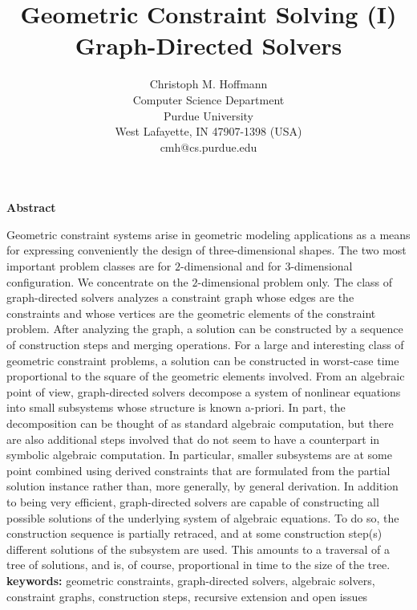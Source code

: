 \textheight 200mm
\title{Geometric Constraint Solving (I) Graph-Directed Solvers}
\author{Christoph M. Hoffmann \\
Computer Science Department \\
Purdue University \\
West Lafayette, IN 47907-1398 (USA) \\
cmh@cs.purdue.edu}



\date{} 
\pagestyle{empty}




\maketitle

\centerline{\bf Abstract}

\medskip
   Geometric constraint systems arise in geometric modeling applications as 
a means for expressing conveniently the design of three-dimensional shapes. 
The two most important problem classes are for $2$-dimensional and for 
$3$-dimensional configuration.  We concentrate on the $2$-dimensional  
problem only.   The class of graph-directed solvers analyzes a constraint 
graph whose edges are the constraints and whose vertices are the geometric 
elements of the constraint problem.  After analyzing the graph, a solution 
can be constructed by a sequence of construction steps and merging 
operations. For a large and interesting class of geometric constraint 
problems, a solution can be constructed in worst-case time proportional to 
the square of the geometric elements involved.   From an algebraic point of 
view, graph-directed solvers decompose a system of nonlinear equations into 
small subsystems whose structure is known a-priori.  In part, the 
decomposition can be thought of as standard algebraic computation, but 
there are also additional steps involved that do not seem to have a 
counterpart in symbolic algebraic computation.  In particular, smaller 
subsystems are at some point combined using derived constraints that are 
formulated from the partial solution instance rather than, more generally, by  
general derivation.   In addition to being very efficient, graph-directed 
solvers are capable of constructing all possible solutions of the underlying 
system of algebraic equations.  To do so, the construction sequence is  
partially retraced, and at some construction step(s) different solutions of 
the subsystem are used.  This amounts to a traversal of a tree of solutions, 
and is, of course, proportional in time to the size of the tree.
\vspace{2 mm}
\newline
{\bf keywords:} geometric constraints, graph-directed solvers, algebraic 
solvers, constraint graphs, construction steps, recursive extension and 
open issues

